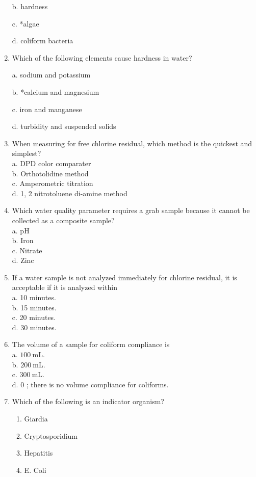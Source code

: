 \begin{enumerate}[1.]
b. hardness

c. *algae

d. coliform bacteria

  \item Which of the following elements cause hardness in water?

a. sodium and potassium

b. *calcium and magnesium

c. iron and manganese

d. turbidity and suspended solids

  \item When measuring for free chlorine residual, which method is the quickest and simplest?\\
a. DPD color comparater\\
b. Orthotolidine method\\
c. Amperometric titration\\
d. 1, 2 nitrotoluene di-amine method


  \item Which water quality parameter requires a grab sample because it cannot be collected as a composite sample?\\
a. $\mathrm{pH}$\\
b. Iron\\
c. Nitrate\\
d. Zinc



    \item If a water sample is not analyzed immediately for chlorine residual, it is acceptable if it is analyzed within\\
a. 10 minutes.\\
b. 15 minutes.\\
c. 20 minutes.\\
d. 30 minutes.

  \item The volume of a sample for coliform compliance is\\
a. $100 \mathrm{~mL}$.\\
b. $200 \mathrm{~mL}$.\\
c. $300 \mathrm{~mL}$.\\
d. 0 ; there is no volume compliance for coliforms.

\item Which of the following is an indicator organism?
\begin{enumerate}
\item Giardia
\item Cryptosporidium
\item Hepatitis
\item E. Coli
\end{enumerate}


\end{enumerate}
